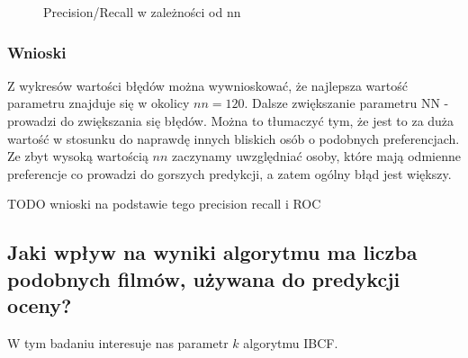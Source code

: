 \documentclass[12pt, a4paper]{article}
\begin{document}
\begin{figure}[H]
  \begin{center}
  \end{center}
  \caption{Precision/Recall w zależności od nn}
  \label{fig:ubcf-nn-rmse}
\end{figure}


\subsubsection{Wnioski}
Z wykresów wartości błędów można wywnioskować, że najlepsza wartość parametru znajduje się w okolicy $nn=120$. Dalsze zwiększanie parametru NN - prowadzi do zwiększania się błędów. Można to tłumaczyć tym, że jest to za duża wartość w stosunku do naprawdę innych bliskich osób o podobnych preferencjach. Ze zbyt wysoką wartością $nn$ zaczynamy uwzględniać osoby, które mają odmienne preferencje co prowadzi do gorszych predykcji, a zatem ogólny błąd jest większy.

TODO wnioski na podstawie tego precision recall i ROC

\subsection{Jaki wpływ na wyniki algorytmu ma liczba podobnych filmów, używana do predykcji oceny?}
W tym badaniu interesuje nas parametr $k$ algorytmu IBCF. 
\end{document}
